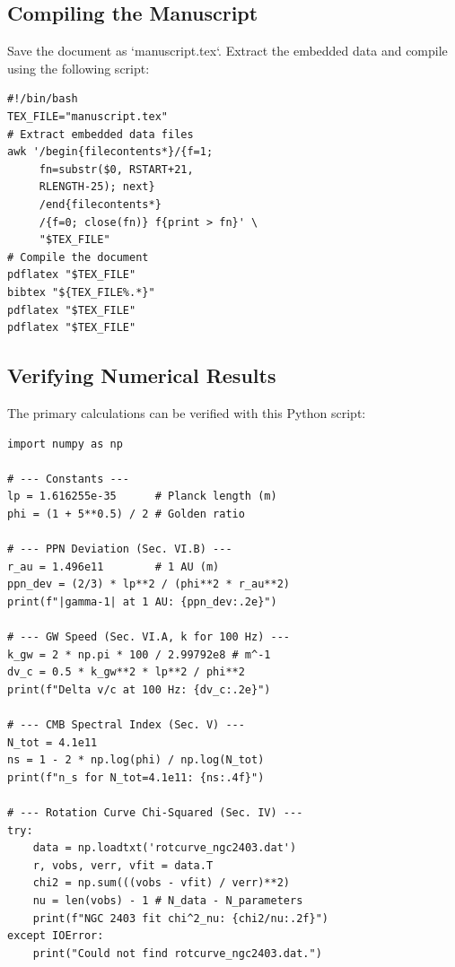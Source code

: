 \documentclass[
  10pt,prd,aps,twocolumn,superscriptaddress,
  nofootinbib,floatfix,tightenlines
]{revtex4-2}
\begin{document}
\subsection{Compiling the Manuscript}
Save the document as `manuscript.tex`. Extract the embedded data and compile using the following script:
\begin{verbatim}
#!/bin/bash
TEX_FILE="manuscript.tex"
# Extract embedded data files
awk '/begin{filecontents*}/{f=1;
     fn=substr($0, RSTART+21,
     RLENGTH-25); next}
     /end{filecontents*}
     /{f=0; close(fn)} f{print > fn}' \
     "$TEX_FILE"
# Compile the document
pdflatex "$TEX_FILE"
bibtex "${TEX_FILE%.*}"
pdflatex "$TEX_FILE"
pdflatex "$TEX_FILE"
\end{verbatim}

\subsection{Verifying Numerical Results}
The primary calculations can be verified with this Python script:
\begin{verbatim}
import numpy as np

# --- Constants ---
lp = 1.616255e-35      # Planck length (m)
phi = (1 + 5**0.5) / 2 # Golden ratio

# --- PPN Deviation (Sec. VI.B) ---
r_au = 1.496e11        # 1 AU (m)
ppn_dev = (2/3) * lp**2 / (phi**2 * r_au**2)
print(f"|gamma-1| at 1 AU: {ppn_dev:.2e}")

# --- GW Speed (Sec. VI.A, k for 100 Hz) ---
k_gw = 2 * np.pi * 100 / 2.99792e8 # m^-1
dv_c = 0.5 * k_gw**2 * lp**2 / phi**2
print(f"Delta v/c at 100 Hz: {dv_c:.2e}")

# --- CMB Spectral Index (Sec. V) ---
N_tot = 4.1e11
ns = 1 - 2 * np.log(phi) / np.log(N_tot)
print(f"n_s for N_tot=4.1e11: {ns:.4f}")

# --- Rotation Curve Chi-Squared (Sec. IV) ---
try:
    data = np.loadtxt('rotcurve_ngc2403.dat')
    r, vobs, verr, vfit = data.T
    chi2 = np.sum(((vobs - vfit) / verr)**2)
    nu = len(vobs) - 1 # N_data - N_parameters
    print(f"NGC 2403 fit chi^2_nu: {chi2/nu:.2f}")
except IOError:
    print("Could not find rotcurve_ngc2403.dat.")
\end{verbatim}



\end{document}
